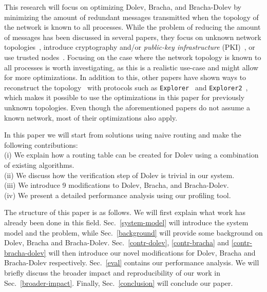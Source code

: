 This research will focus on optimizing Dolev, Bracha, and Bracha-Dolev by minimizing the amount of redundant messages transmitted when the topology of the network is known to all processes. While the problem of reducing the amount of messages has been discussed in several papers, they focus on unknown network topologies~\cite{bonomi2021practical,bonomi2019multihop,dolev-improvement}, introduce cryptography and/or \textit{public-key infrastructure} (PKI)~\cite{signatures-crypo-1,pki-crypto-2}, or use trusted nodes~\cite{using-tee}. Focusing on the case where the network topology is known to all processes is worth investigating, as this is a realistic use-case and might allow for more optimizations. In addition to this, other papers have shown ways to reconstruct the topology~\cite{topology-discovery} with protocols such as \texttt{Explorer}~\cite{explorer} and \texttt{Explorer2}~\cite{explorer2}, which makes it possible to use the optimizations in this paper for previously unknown topologies.
Even though the aforementioned papers do not assume a known network, most of their optimizations also apply.

In this paper we will start from solutions using naive routing and make the following contributions:\\
(i) We explain how a routing table can be created for Dolev using a combination of existing algorithms.\\
(ii) We discuss how the verification step of Dolev is trivial in our system.\\
(iii) We introduce 9 modifications to Dolev, Bracha, and Bracha-Dolev.\\
(iv) We present a detailed performance analysis using our profiling tool.

The structure of this paper is as follows. We will first explain what work has already been done in this field. Sec.~\ref{system-model} will introduce the system model and the problem, while Sec.~\ref{background} will provide some background on Dolev, Bracha and Bracha-Dolev. Sec.~\ref{contr-dolev}, \ref{contr-bracha} and \ref{contr-bracha-dolev} will then introduce our novel modifications for Dolev, Bracha and Bracha-Dolev respectively. Sec.~\ref{eval} contains our performance analysis. We will briefly discuss the broader impact and reproducibility of our work in Sec.~\ref{broader-impact}. Finally, Sec.~\ref{conclusion} will conclude our paper.

